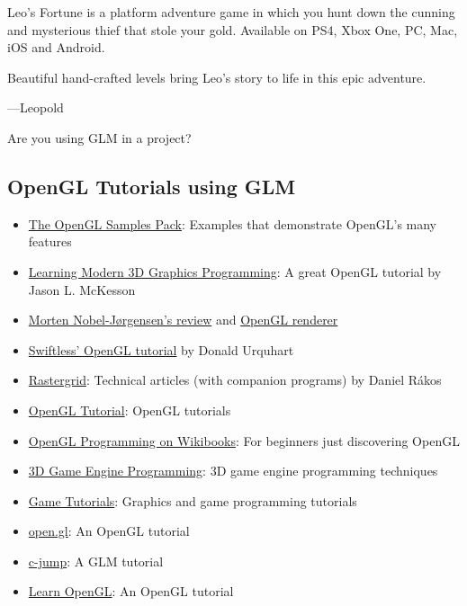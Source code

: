 \documentclass{scrartcl}
\numberwithin{figure}{subsection}
\begin{document}
Leo's Fortune is a platform adventure game in which you hunt down the cunning and mysterious thief that stole your gold. Available on PS4, Xbox One, PC, Mac, iOS and Android.

Beautiful hand-crafted levels bring Leo's story to life in this epic adventure. 



 ---Leopold

Are you using GLM in a project?  

\subsection{OpenGL Tutorials using GLM}

\begin{itemize}
  \item \href{http://www.g-truc.net/project-0026.html#menu}{The OpenGL Samples Pack}: Examples that demonstrate OpenGL's many features
  \item \href{http://www.arcsynthesis.org/gltut/}{Learning Modern 3D Graphics Programming}: A great OpenGL tutorial by Jason L. McKesson
  \item \href{http://blog.nobel-joergensen.com/2011/04/02/glm-brilliant-math-library-for-opengl/}{Morten Nobel-Jørgensen's review} and \href{https://github.com/mortennobel/RenderE}{OpenGL renderer} 
  \item \href{http://www.swiftless.com/opengltuts.html}{Swiftless' OpenGL tutorial} by Donald Urquhart
  \item \href{http://rastergrid.com/blog/}{Rastergrid}: Technical articles (with companion programs) by Daniel Rákos
  \item \href{http://www.opengl-tutorial.org}{OpenGL Tutorial}: OpenGL tutorials
  \item \href{http://en.wikibooks.org/wiki/OpenGL_Programming}{OpenGL Programming on Wikibooks}: For beginners just discovering OpenGL
  \item \href{http://3dgep.com/}{3D Game Engine Programming}: 3D game engine programming techniques
  \item \href{http://www.gametutorials.com/opengl-4-matrices-and-glm/}{Game Tutorials}: Graphics and game programming tutorials 
  \item \href{https://open.gl/}{open.gl}: An OpenGL tutorial
  \item \href{http://www.c-jump.com/bcc/common/Talk3/Math/GLM/GLM.html}{c-jump}: A GLM tutorial
  \item \href{http://learnopengl.com/}{Learn OpenGL}: An OpenGL tutorial
\end{itemize}
\end{document}
